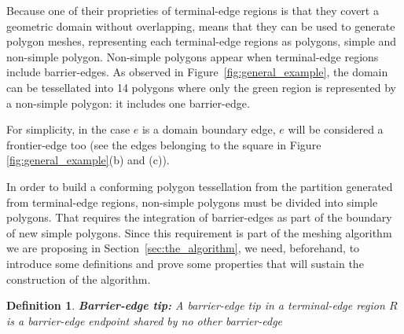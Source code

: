 \documentclass[pdflatex,sn-mathphys]{sn-jnl}%
\theoremstyle{thmstyleone}%
\theoremstyle{thmstyletwo}%
\theoremstyle{thmstylethree}%
\newtheorem{definition}{Definition}%
\begin{document}
Because one of their proprieties of terminal-edge regions is that they covert a geometric domain without overlapping, means that they can be used to generate polygon meshes, representing each terminal-edge regions as polygons, simple and non-simple polygon. Non-simple polygons appear when terminal-edge regions include barrier-edges.  As observed in Figure~\ref{fig:general_example}, the domain can be tessellated into 14 polygons where only the green region is represented by a  non-simple polygon: it includes one barrier-edge. 



\noindent
For simplicity, in the case  $e$ is a domain boundary edge, $e$ will be considered a frontier-edge too (see the edges belonging to the square in Figure \ref{fig:general_example}(b) and (c)). 
  

In order to build a conforming polygon tessellation from the partition generated from terminal-edge regions, non-simple polygons must be divided into simple polygons. That requires the integration of barrier-edges as part of the boundary of new simple polygons.  Since this requirement is part of the meshing algorithm we are proposing in Section~\ref{sec:the_algorithm}, we need, beforehand, to introduce some definitions and prove some properties that will sustain the construction of the algorithm.


\begin{definition}{\textbf{Barrier-edge tip:}}
\label{d:barrier-edge}
A barrier-edge tip in a terminal-edge region $R$ is a barrier-edge endpoint shared by no other barrier-edge%
\end{definition}
\end{document}
